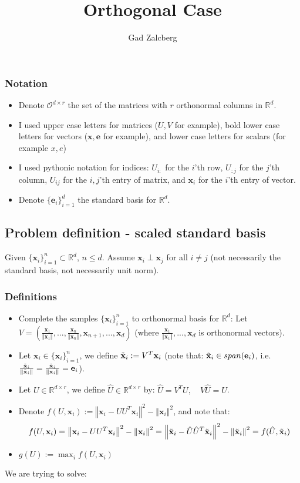 \documentclass{article}
\title{Orthogonal Case}
\author{Gad Zalcberg}
\newcommand{\x}{{\mathbf x}}
\newcommand{\e}{{\mathbf e}}
\newcommand{\norm}[1]{\left\Vert #1\right\Vert}
\newcommand{\cO}{\mathcal{O}}
\newcommand{\orth}[2]{\cO^{#1\times #2}}
\newcommand{\R}{\mathbb{R}}
\begin{document}
\maketitle

\subsubsection{Notation}
\begin{itemize}
    \item Denote $\orth{d}{r}$ the set of the matrices with $r$ orthonormal columns in $\R^d$.
    \item I used upper case letters for matrices ($U,V$ for example), bold lower case letters for vectors ($\x,\e$ for example), and lower case letters for scalars (for example $x,e$)
    \item I used pythonic notation for indices:
    $U_{i:}$ for the $i$'th row, $U_{:j}$ for the $j$'th column, $U_{ij}$ for the $i,j$'th entry of matrix, and $\x_{i}$ for the $i$'th entry of vector.
    \item Denote $\{\e_i\}_{i=1}^d$ the standard basis for $\R^d$.
\end{itemize}

\subsection{Problem definition - scaled standard basis}
Given $\{\x_i\}_{i=1}^n\subset\R^d$, $n\le d$. Assume $\x_i\perp \x_j$ for all $i\ne j$ (not necessarily the standard basis, not necessarily unit norm). 

\subsubsection{Definitions}
\begin{itemize}
    \item Complete the samples $\{\x_i\}_{i=1}^n$ to orthonormal basis for $\R^d$: Let $V=\left(\frac{\x_1}{\Vert \x_1\Vert},...,\frac{\x_n}{\Vert \x_n\Vert}, \x_{n+1},...,\x_d\right)$ (where $\frac{\x_1}{\Vert \x_1\Vert},...,\x_d$ is orthonormal vectors).
    \item Let $\x_i\in\{\x_i\}_{i=1}^n$, we define $\Tilde{\x}_i:=V^T\x_i$ (note that: $\Tilde{\x}_i\in span(\e_i)$, i.e. $\frac{\Tilde{\x}_i}{\norm{\Tilde{\x}_i}}=\frac{\Tilde{\x}_i}{\norm{{\x}_i}}=\e_i$).
    \item Let  $U\in\mathbb{R}^{d\times r}$, we define $\hat{U}\in\mathbb{R}^{d\times r}$ by: $\hat{U}=V^TU,\quad V\hat{U}=U$.
    \item Denote $f(U,\x_i):=\left\Vert\x_{i}-UU^{T}\x_{i}\right\Vert^{2}-\left\Vert\x_{i}\right\Vert ^{2}$, and note that: $$f(U,\x_i)=\norm{\x_{i}-UU^{T}\x_{i}}^2-\norm{\x_{i}}^2=
    \norm{\Tilde{\x}_{i}-\hat{U}\hat{U}^{T}\Tilde{\x}_{i}}^2-\norm{\Tilde{\x}_{i}}^2=f(\hat{U},\Tilde{\x}_i)$$
    \item $g(U):=\max_if(U,\x_i)$
\end{itemize}
We are trying to solve:
\end{document}
